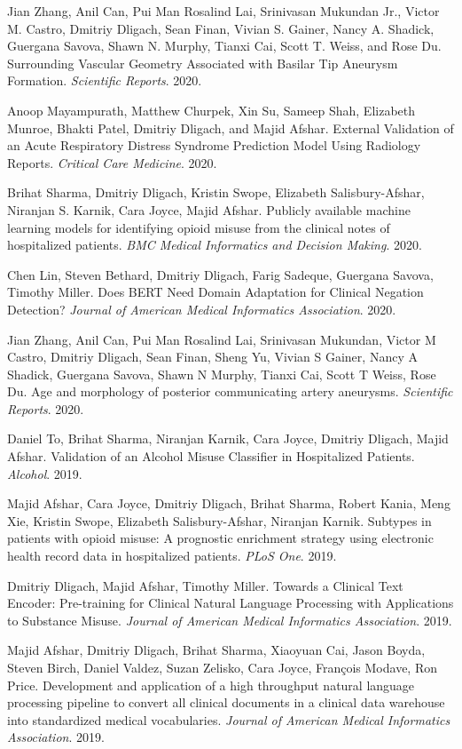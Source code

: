 \documentclass[letterpaper]{article}
\renewenvironment{itemize}{
  \begin{list}{}{
    \setlength{\leftmargin}{1.5em}
  }
}{
  \end{list}
}
\begin{document}
\begin{itemize}
\item Jian Zhang, Anil Can, Pui Man Rosalind Lai, Srinivasan Mukundan Jr., Victor M. Castro, Dmitriy Dligach, Sean Finan, Vivian S. Gainer, Nancy A. Shadick, Guergana Savova, Shawn N. Murphy, Tianxi Cai, Scott T. Weiss, and Rose Du. Surrounding Vascular Geometry Associated with Basilar Tip Aneurysm Formation. \emph{Scientific Reports}. 2020.
\item Anoop Mayampurath, Matthew Churpek, Xin Su, Sameep Shah, Elizabeth Munroe, Bhakti Patel, Dmitriy Dligach, and Majid Afshar. External Validation of an Acute Respiratory Distress Syndrome Prediction Model Using Radiology Reports. \emph{Critical Care Medicine}. 2020.
\item Brihat Sharma, Dmitriy Dligach, Kristin Swope, Elizabeth Salisbury-Afshar, Niranjan S. Karnik, Cara Joyce, Majid Afshar. Publicly available machine learning models for identifying opioid misuse from the clinical notes of hospitalized patients. \emph{BMC Medical Informatics and Decision Making}. 2020.
\item Chen Lin, Steven Bethard, Dmitriy Dligach, Farig Sadeque, Guergana Savova, Timothy Miller. Does BERT Need Domain Adaptation for Clinical Negation Detection? \emph{Journal of American Medical Informatics Association}. 2020.
\item Jian Zhang, Anil Can, Pui Man Rosalind Lai, Srinivasan Mukundan, Victor M Castro, Dmitriy Dligach, Sean Finan, Sheng Yu, Vivian S Gainer, Nancy A Shadick, Guergana Savova, Shawn N Murphy, Tianxi Cai, Scott T Weiss, Rose Du. Age and morphology of posterior communicating artery aneurysms. \emph{Scientific Reports}. 2020.
\item Daniel To, Brihat Sharma, Niranjan Karnik, Cara Joyce, Dmitriy Dligach, Majid Afshar. Validation of an Alcohol Misuse Classifier in Hospitalized Patients. \emph{Alcohol}. 2019.
\item Majid Afshar, Cara Joyce, Dmitriy Dligach, Brihat Sharma, Robert Kania, Meng Xie, Kristin Swope, Elizabeth Salisbury-Afshar, Niranjan Karnik. Subtypes in patients with opioid misuse: A prognostic enrichment strategy using electronic health record data in hospitalized patients. \emph{PLoS One}. 2019.
\item Dmitriy Dligach, Majid Afshar, Timothy Miller. Towards a Clinical Text Encoder: Pre-training for Clinical Natural Language Processing with Applications to Substance Misuse. \emph{Journal of American Medical Informatics Association}. 2019.
\item  Majid Afshar, Dmitriy Dligach, Brihat Sharma, Xiaoyuan Cai, Jason Boyda, Steven Birch, Daniel Valdez, Suzan Zelisko, Cara Joyce, François Modave, Ron Price. Development and application of a high throughput natural language processing pipeline to convert all clinical documents in a clinical data warehouse into standardized medical vocabularies. \emph{Journal of American Medical Informatics Association}. 2019.

\end{itemize}
\end{document}
